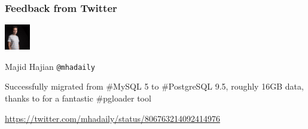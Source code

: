 \documentclass[xcolor=dvipsnames]{beamer}
\begin{document}
{

  \begin{frame}[fragile]
    \frametitle{Feedback from Twitter}

    \begin{center}
      \begin{minipage}{0,6\textwidth}
        \begin{minipage}{0,2\textwidth}
          \includegraphics[height=3em]{majid_hajian.jpg}
        \end{minipage}
        \begin{minipage}{0,8\textwidth}
          Majid Hajian \newline
          \texttt{@mhadaily}
        \end{minipage}
      \end{minipage}
      \rule[10pt]{0,6\textwidth}{1px}
      
      \begin{minipage}{0,6\textwidth}
        \begin{Large}
          Successfully migrated from \#MySQL 5 to \#PostgreSQL 9.5, roughly
          16GB data, thanks to \@tapoueh for a fantastic \#pgloader tool
        \end{Large}
      \end{minipage}
      \rule{0,6\textwidth}{1px}

      \vfill
      \url{https://twitter.com/mhadaily/status/806763214092414976}
    \end{center}
    
  \end{frame}
}
\end{document}
